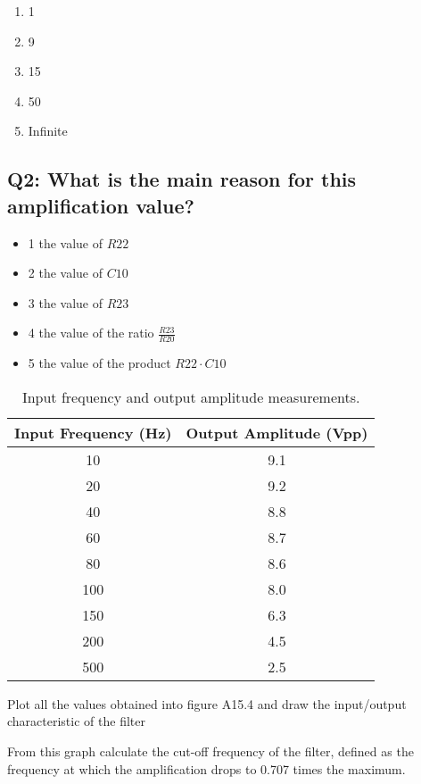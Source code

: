 \begin{enumerate}
    \item 1
    \item 9
    \item 15
    \item 50
    \item Infinite
\end{enumerate}

\subsection*{Q2: What is the main reason for this amplification value?}
\begin{itemize}
    \item 1 the value of $R22$
    \item 2 the value of $C10$
    \item 3 the value of $R23$
    \item 4 the value of the ratio $\frac{R23}{R20}$
    \item 5 the value of the product $R22 \cdot C10$
\end{itemize}


\begin{table}[H]
    \centering
    \begin{tabular}{|c|c|}
        \hline
        \textbf{Input Frequency (Hz)} & \textbf{Output Amplitude (Vpp)} \\
        \hline
        10 & 9.1 \\
        20 & 9.2 \\
        40 & 8.8 \\
        60 & 8.7 \\
        80 & 8.6 \\
        100 & 8.0 \\
        150 & 6.3 \\
        200 & 4.5 \\
        500 & 2.5 \\
        \hline
    \end{tabular}
    \caption{Input frequency and output amplitude measurements.}
    \label{table:A15.1}
\end{table}

Plot all the values obtained into figure A15.4 and draw the
input/output characteristic of the filter

From this graph calculate the cut-off frequency of the filter, defined
as the frequency at which the amplification drops to 0.707 times the
maximum. 

